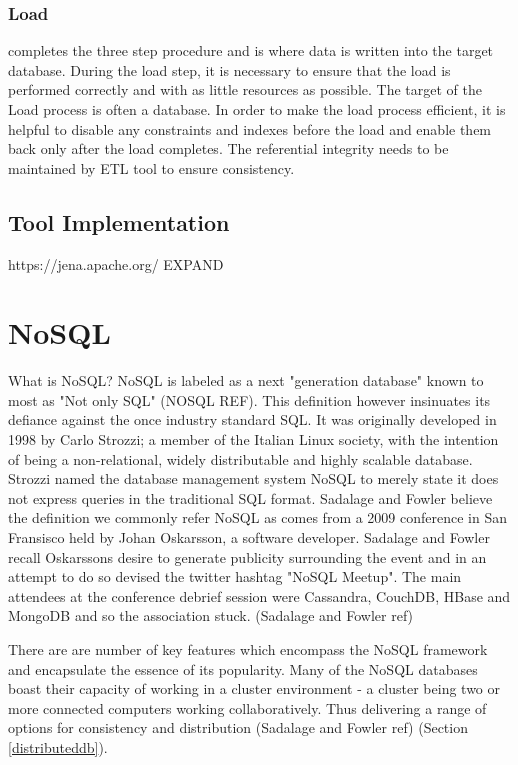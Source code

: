 \subsubsection{Load} completes the three step procedure and is where data is written into the target database. During the load step, it is necessary to ensure that the load is performed correctly and with as little resources as possible. The target of the Load process is often a database. In order to make the load process efficient, it is helpful to disable any constraints and indexes before the load and enable them back only after the load completes. The referential integrity needs to be maintained by ETL tool to ensure consistency.

\subsection{Tool Implementation}
https://jena.apache.org/
EXPAND

\section{NoSQL}
What is NoSQL? NoSQL is labeled as a next "generation database" known to most as "Not only SQL" (NOSQL REF). This definition however insinuates its defiance against the once industry standard SQL. It was originally developed in 1998 by Carlo Strozzi; a member of the Italian Linux society, with the intention of being a non-relational, widely distributable and highly scalable database. Strozzi named the database management system NoSQL to merely state it does not express queries in the traditional SQL format. Sadalage and Fowler believe the definition we commonly refer NoSQL as comes from a 2009 conference in San Fransisco held by Johan Oskarsson, a software developer. Sadalage and Fowler recall Oskarssons desire to generate publicity surrounding the event and in an attempt to do so devised the twitter hashtag "NoSQL Meetup". The main attendees at the conference debrief session were Cassandra, CouchDB, HBase and MongoDB and so the association stuck. (Sadalage and Fowler ref)

There are are number of key features which encompass the NoSQL framework and encapsulate the essence of its popularity. Many of the NoSQL databases boast their capacity of working in a cluster environment - a cluster being two or more connected computers working collaboratively. Thus delivering a range of options for consistency and distribution (Sadalage and Fowler ref) (Section \ref{distributeddb}).

